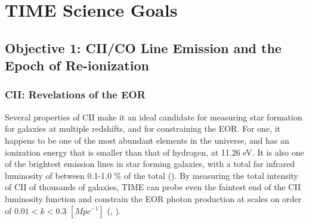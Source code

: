 \documentclass[manuscript]{aastex}
\begin{document}

\section{TIME Science Goals}
\subsection{Objective 1: CII/CO Line Emission and the Epoch of Re-ionization}


\subsubsection{CII: Revelations of the EOR}
Several properties of CII make it an ideal candidate for measuring star formation for galaxies at multiple redshifts, and for constraining the EOR. For one, it happens to be one of the most abundant elements in the universe, and has an ionization energy that is smaller than that of hydrogen, at 11.26 eV. It is also one of the brightest emission lines in star forming galaxies, with a total far infrared luminosity of between 0.1-1.0 \% of the total (\cite{Stacey1991}). By measuring the total intensity of CII of thousands of galaxies, TIME can probe even the faintest end of the CII luminosity function and constrain the EOR photon production at scales on order of  $0.01 < k < 0.3$  $[Mpc^{-1}]$  (\cite{Gong2012}, \cite{Crites2014}). 
\end{document}
